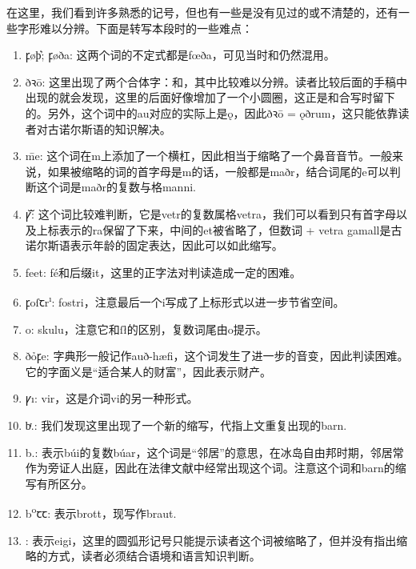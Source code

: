 在这里，我们看到许多熟悉的记号，但也有一些是没有见过的或不清楚的，还有一些字形难以分辨。下面是转写本段时的一些难点：
\begin{enumerate}[itemindent=1em, label=\textbf{\arabic*}.]
    \item {\medieval ꝼøþ͛; ꝼøða}: 这两个词的不定式都是fœða，可见当时\th 和\dh 仍然混用。

    \item {ð{\andron ꝛ}\=o}: 这里出现了两个合体字：{}和{}，其中{}比较难以分辨。读者比较后面的手稿中出现的\dh 就会发现，这里的\dh 后面好像增加了一个小圆圈，这正是和{}合写时留下的。另外，这个词中的au对应的实际上是\k{o}，因此{ð{\andron ꝛ}\=o} = ǫðrum，这只能依靠读者对古诺尔斯语的知识解决。

    \item {\medieval \=me}: 这个词在m上添加了一个横杠，因此相当于缩略了一个鼻音音节。一般来说，如果被缩略的词的首字母是m的话，一般都是maðr，结合词尾的e可以判断这个词是maðr的复数与格manni.

    \item {\medieval ꝩᷓ}: 这个词比较难判断，它是vetr的复数属格vetra，我们可以看到只有首字母以及上标表示的ra保留了下来，中间的et被省略了，但数词 + vetra gamall是古诺尔斯语表示年龄的固定表达，因此可以如此缩写。

    \item {\medieval feet}: fé和后缀it，这里的正字法对判读造成一定的困难。

    \item {\medieval ꝼoſꞇr\textsuperscript{ı}}: fostri，注意最后一个i写成了上标形式以进一步节省空间。

    \item {o}: skulu，注意它和{ſ\l}的区别，复数词尾由o提示。

    \item {ðỏꝼe}: 字典形一般记作auð-hæfi，这个词发生了进一步的音变，因此判读困难。它的字面义是“适合某人的财富”，因此表示财产。

    \item {\medieval ꝩı}: vi\dh r，这是介词vi\dh 的另一种形式。

    \item {\medieval bͬ.}: 我们发现这里出现了一个新的缩写，代指上文重复出现的barn.

    \item {\medieval b.}: 表示búi的复数búar，这个词是“邻居”的意思，在冰岛自由邦时期，邻居常作为旁证人出庭，因此在法律文献中经常出现这个词。注意这个词和barn的缩写有所区分。

    \item {\medieval b\textsuperscript{o}ꞇꞇ}: 表示brott，现写作braut.

    \item {\medieval {}}: 表示eigi，这里的圆弧形记号只能提示读者这个词被缩略了，但并没有指出缩略的方式，读者必须结合语境和语言知识判断。

\end{enumerate}
\medskip

